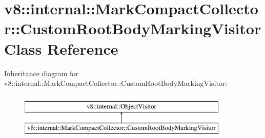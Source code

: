 \hypertarget{classv8_1_1internal_1_1MarkCompactCollector_1_1CustomRootBodyMarkingVisitor}{}\section{v8\+:\+:internal\+:\+:Mark\+Compact\+Collector\+:\+:Custom\+Root\+Body\+Marking\+Visitor Class Reference}
\label{classv8_1_1internal_1_1MarkCompactCollector_1_1CustomRootBodyMarkingVisitor}
Inheritance diagram for v8\+:\+:internal\+:\+:Mark\+Compact\+Collector\+:\+:Custom\+Root\+Body\+Marking\+Visitor\+:\begin{figure}[H]
\begin{center}
\leavevmode
\includegraphics[height=2.000000cm]{classv8_1_1internal_1_1MarkCompactCollector_1_1CustomRootBodyMarkingVisitor}
\end{center}
\end{figure}

